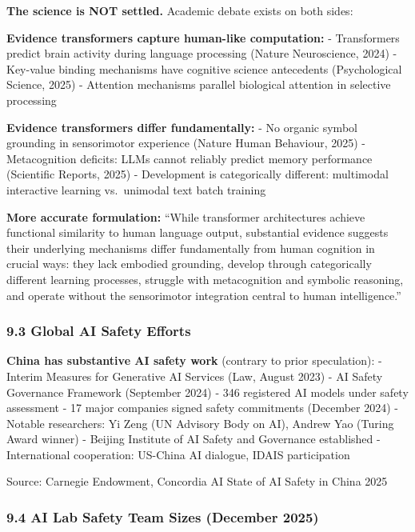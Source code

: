 \documentclass[
]{article}
\begin{document}
\textbf{The science is NOT settled.} Academic debate exists on both
sides:

\textbf{Evidence transformers capture human-like computation:} -
Transformers predict brain activity during language processing (Nature
Neuroscience, 2024) - Key-value binding mechanisms have cognitive
science antecedents (Psychological Science, 2025) - Attention mechanisms
parallel biological attention in selective processing

\textbf{Evidence transformers differ fundamentally:} - No organic symbol
grounding in sensorimotor experience (Nature Human Behaviour, 2025) -
Metacognition deficits: LLMs cannot reliably predict memory performance
(Scientific Reports, 2025) - Development is categorically different:
multimodal interactive learning vs.~unimodal text batch training

\textbf{More accurate formulation:} ``While transformer architectures
achieve functional similarity to human language output, substantial
evidence suggests their underlying mechanisms differ fundamentally from
human cognition in crucial ways: they lack embodied grounding, develop
through categorically different learning processes, struggle with
metacognition and symbolic reasoning, and operate without the
sensorimotor integration central to human intelligence.''

\hypertarget{global-ai-safety-efforts}{%
\subsubsection{9.3 Global AI Safety
Efforts}\label{global-ai-safety-efforts}}

\textbf{China has substantive AI safety work} (contrary to prior
speculation): - Interim Measures for Generative AI Services (Law, August
2023) - AI Safety Governance Framework (September 2024) - 346 registered
AI models under safety assessment - 17 major companies signed safety
commitments (December 2024) - Notable researchers: Yi Zeng (UN Advisory
Body on AI), Andrew Yao (Turing Award winner) - Beijing Institute of AI
Safety and Governance established - International cooperation: US-China
AI dialogue, IDAIS participation

Source: Carnegie Endowment, Concordia AI State of AI Safety in China
2025

\hypertarget{ai-lab-safety-team-sizes-december-2025}{%
\subsubsection{9.4 AI Lab Safety Team Sizes (December
2025)}\label{ai-lab-safety-team-sizes-december-2025}}
\end{document}
